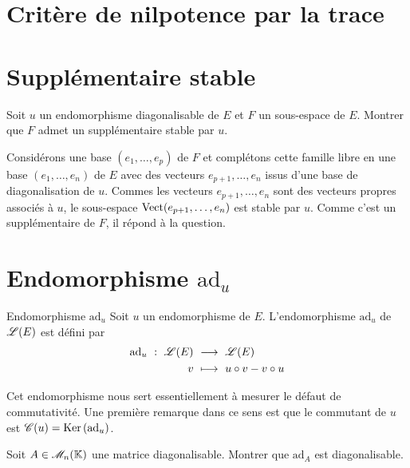 \section{Critère de nilpotence par la trace} 


\section{Supplémentaire stable}

\begin{exercice}
    Soit $u$ un endomorphisme diagonalisable de $E$ et $F$ un sous-espace de $E$. Montrer que $F$ admet un supplémentaire stable par $u$. 
\end{exercice}

\begin{solution}
    Considérons une base $(e_1, \dots, e_p)$ de $F$ et complétons cette famille libre en une base $(e_1, \dots, e_n)$ de $E$ avec des vecteurs $e_{p+1}, \dots, e_n$ issus d'une base de diagonalisation de $u$. Commes les vecteurs $e_{p+1}, \dots, e_n$ sont des vecteurs propres associés à $u$, le sous-espace $\mathrm{Vect}(e_{p+1}, \dots, e_n)$ est stable par $u$. Comme c'est un supplémentaire de $F$, il répond à la question. 
\end{solution} 

\section{Endomorphisme \texorpdfstring{$\mathrm{ad}_u$}{ad_u}}
\begin{defi}{Endomorphisme $\mathrm{ad}_u$}
    Soit $u$ un endomorphisme de $E$. L'endomorphisme $\mathrm{ad}_u$ de $\mathscr{L}(E)$ est défini par
    \begin{alignat*}{2}
        \mathrm{ad}_u\ :\ \mathscr{L}(E)\ &\longrightarrow\ \mathscr{L}(E)\\
        v\ &\longmapsto\ u \circ v - v \circ u
    \end{alignat*}
\end{defi}

Cet endomorphisme nous sert essentiellement à mesurer le défaut de commutativité. Une première remarque dans ce sens est que le commutant de $u$ est $\mathscr{C}(u) = \mathrm{Ker}\,(\mathrm{ad}_u)$. 

\begin{exercice}
    Soit $A \in \mathscr{M}_n(\mathbb{K})$ une matrice diagonalisable. Montrer que $\mathrm{ad}_A$ est diagonalisable.
\end{exercice}

